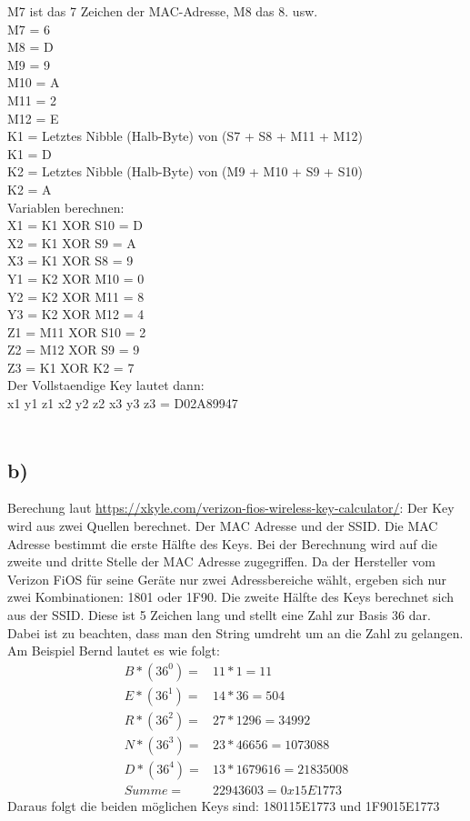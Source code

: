 \documentclass[10pt,a4paper]{article}
\begin{document}
M7 ist das 7 Zeichen der MAC-Adresse, M8 das 8. usw.\\
M7 =  6 \\
M8 =  D \\
M9 =  9 \\
M10 =  A \\
M11 =  2 \\
M12 =  E \\

K1 = Letztes Nibble (Halb-Byte) von (S7 + S8 + M11 + M12)\\
K1 =  D \\

K2 = Letztes Nibble (Halb-Byte) von (M9 + M10 + S9 + S10)\\
K2 =  A \\

Variablen berechnen:\\
X1 = K1  XOR S10 =  D \\
X2 = K1  XOR S9  =  A \\
X3 = K1  XOR S8  =  9 \\
Y1 = K2  XOR M10 =  0 \\
Y2 = K2  XOR M11 =  8 \\
Y3 = K2  XOR M12 =  4 \\
Z1 = M11 XOR S10 =  2 \\
Z2 = M12 XOR S9  =  9 \\
Z3 = K1  XOR K2  =  7 \\
 
Der Vollstaendige Key lautet dann:\\
x1 y1 z1 x2 y2 z2 x3 y3 z3 = D02A89947 \\\\


\subsection*{b)}
Berechung laut \href{https://xkyle.com/verizon-fios-wireless-key-calculator/}{https://xkyle.com/verizon-fios-wireless-key-calculator/}:
Der Key wird aus zwei Quellen berechnet. Der MAC Adresse und der SSID. Die MAC Adresse bestimmt die erste Hälfte des Keys. Bei der Berechnung wird auf die zweite und dritte Stelle der MAC Adresse zugegriffen. Da der Hersteller vom Verizon FiOS für seine Geräte nur zwei Adressbereiche wählt, ergeben sich nur zwei Kombinationen: 1801 oder 1F90. 
Die zweite Hälfte des Keys berechnet sich aus der SSID. Diese ist 5 Zeichen lang und stellt eine Zahl zur Basis 36 dar. Dabei ist zu beachten, dass man den String umdreht um an die Zahl zu gelangen.
Am Beispiel Bernd lautet es wie folgt:\\
\begin{align*}
B*(36^0) = &11 * 1 = 11\\
E*(36^1) = &14 * 36 = 504\\
R*(36^2) = &27 * 1296 = 34992\\
N*(36^3) = &23 * 46656 = 1073088\\
D*(36^4) = &13 * 1679616 = 21835008\\
Summe = &22943603 = 0x15E1773
\end{align*}
Daraus folgt die beiden möglichen Keys sind: 180115E1773 und 1F9015E1773
\end{document}
